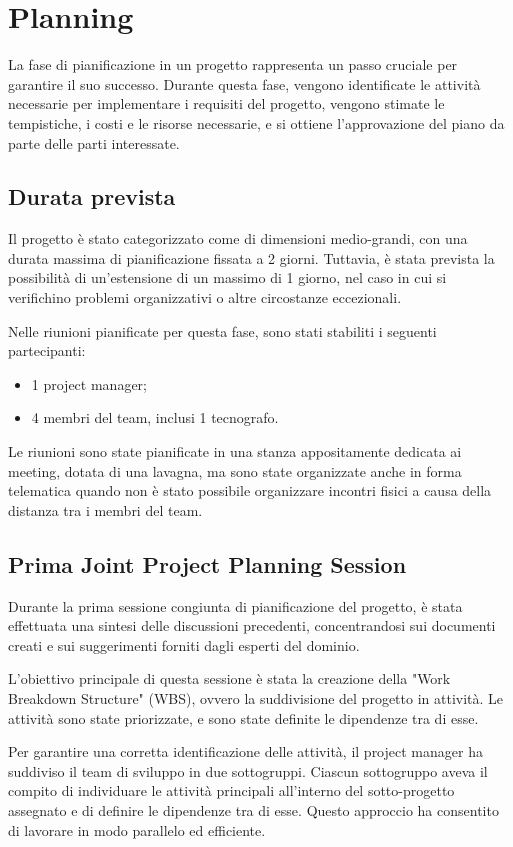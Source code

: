 \section{Planning}

La fase di pianificazione in un progetto rappresenta un passo cruciale per garantire il suo successo. Durante questa fase, vengono identificate le attività necessarie per implementare i requisiti del progetto, vengono stimate le tempistiche, i costi e le risorse necessarie, e si ottiene l'approvazione del piano da parte delle parti interessate.

\subsection{Durata prevista}
Il progetto è stato categorizzato come di dimensioni medio-grandi, con una durata massima di pianificazione fissata a 2 giorni. Tuttavia, è stata prevista la possibilità di un'estensione di un massimo di 1 giorno, nel caso in cui si verifichino problemi organizzativi o altre circostanze eccezionali.

Nelle riunioni pianificate per questa fase, sono stati stabiliti i seguenti partecipanti:
\begin{itemize}
    \item 1 project manager;
    \item 4 membri del team, inclusi 1 tecnografo.
\end{itemize}

Le riunioni sono state pianificate in una stanza appositamente dedicata ai meeting, dotata di una lavagna, ma sono state organizzate anche in forma telematica quando non è stato possibile organizzare incontri fisici a causa della distanza tra i membri del team.

\subsection{Prima Joint Project Planning Session}
Durante la prima sessione congiunta di pianificazione del progetto, è stata effettuata una sintesi delle discussioni precedenti, concentrandosi sui documenti creati e sui suggerimenti forniti dagli esperti del dominio.

L'obiettivo principale di questa sessione è stata la creazione della "Work Breakdown Structure" (WBS), ovvero la suddivisione del progetto in attività. Le attività sono state priorizzate, e sono state definite le dipendenze tra di esse.

Per garantire una corretta identificazione delle attività, il project manager ha suddiviso il team di sviluppo in due sottogruppi. Ciascun sottogruppo aveva il compito di individuare le attività principali all'interno del sotto-progetto assegnato e di definire le dipendenze tra di esse. Questo approccio ha consentito di lavorare in modo parallelo ed efficiente.

